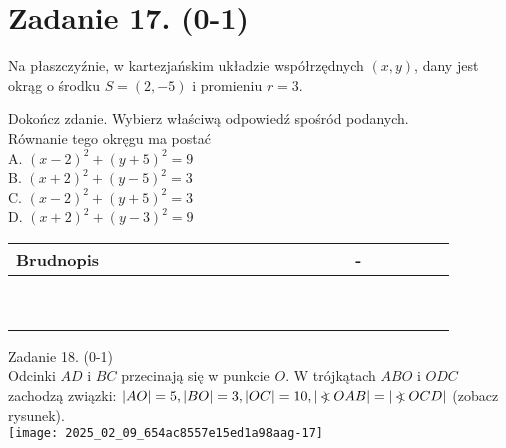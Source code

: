 \documentclass[10pt]{article}
\newcommand\Varangle{\mathop{{<\!\!\!\!\!\text{\small)}}\:}\nolimits}
\begin{document}
\section*{Zadanie 17. (0-1)}
Na płaszczyźnie, w kartezjańskim układzie współrzędnych \((x, y)\), dany jest okrąg o środku \(S=(2,-5)\) i promieniu \(r=3\).

Dokończ zdanie. Wybierz właściwą odpowiedź spośród podanych.\\
Równanie tego okręgu ma postać\\
A. \((x-2)^{2}+(y+5)^{2}=9\)\\
B. \((x+2)^{2}+(y-5)^{2}=3\)\\
C. \((x-2)^{2}+(y+5)^{2}=3\)\\
D. \((x+2)^{2}+(y-3)^{2}=9\)

\begin{center}
\begin{tabular}{|c|c|c|c|c|c|c|c|c|c|c|c|c|c|c|c|c|c|c|c|c|c|c|c|c|}
\hline
\multicolumn{4}{|l|}{Brudnopis} &  &  &  &  &  &  &  &  &  &  &  &  &  &  &  & - &  &  &  &  &  \\
\hline
 &  &  &  &  &  &  &  &  &  &  &  &  &  &  &  &  &  &  &  &  &  &  &  &  \\
\hline
 &  &  &  &  &  &  &  &  &  &  &  &  &  &  &  &  &  &  &  &  &  &  &  &  \\
\hline
 &  &  &  &  &  &  &  &  &  &  &  &  &  &  &  &  &  &  &  &  &  &  &  &  \\
\hline
 &  &  &  &  &  &  &  &  &  &  &  &  &  &  &  &  &  &  &  &  &  &  &  &  \\
\hline
 &  &  &  &  &  &  &  &  &  &  &  &  &  &  &  &  &  &  &  &  &  &  &  &  \\
\hline
 &  &  &  &  &  &  &  &  &  &  &  &  &  &  &  &  &  &  &  &  &  &  &  &  \\
\hline
 &  &  &  &  &  &  &  &  &  &  &  &  &  &  &  &  &  &  &  &  &  &  &  &  \\
\hline
 &  &  &  &  &  &  &  &  &  &  &  &  &  &  &  &  &  &  &  &  &  &  &  &  \\
\hline
 &  &  &  &  &  &  &  &  &  &  &  &  &  &  &  &  &  &  &  &  &  &  &  &  \\
\hline
\end{tabular}
\end{center}

Zadanie 18. (0-1)\\
Odcinki \(A D\) i \(B C\) przecinają się w punkcie \(O\). W trójkątach \(A B O\) i \(O D C\) zachodzą związki: \(|A O|=5,|B O|=3,|O C|=10,|\Varangle O A B|=|\Varangle O C D|\) (zobacz rysunek).\\
\texttt{[image: 2025\_02\_09\_654ac8557e15ed1a98aag-17]}
\end{document}
